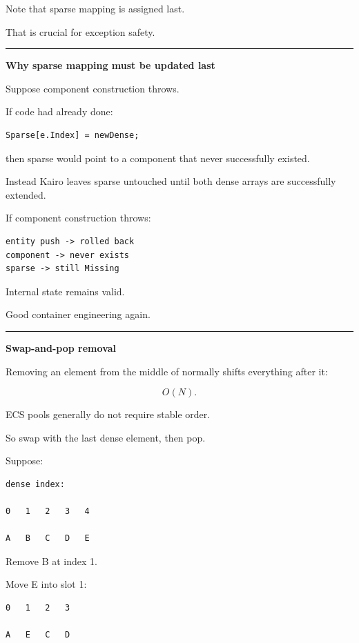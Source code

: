 Note that sparse mapping is assigned last.

That is crucial for exception safety.

\begin{center}\rule{0.5\linewidth}{0.5pt}\end{center}

\textbf{Why sparse mapping must be updated last}

Suppose component construction throws.

If code had already done:

\begin{verbatim}
Sparse[e.Index] = newDense;
\end{verbatim}

then sparse would point to a component that never successfully existed.

Instead Kairo leaves sparse untouched until both dense arrays are successfully extended.

If component construction throws:

\begin{verbatim}
entity push -> rolled back
component -> never exists
sparse -> still Missing
\end{verbatim}

Internal state remains valid.

Good container engineering again.

\begin{center}\rule{0.5\linewidth}{0.5pt}\end{center}

\textbf{Swap-and-pop removal}

Removing an element from the middle of  normally shifts everything after it:

\[
O(N).
\]

ECS pools generally do not require stable order.

So swap with the last dense element, then pop.

Suppose:

\begin{verbatim}
dense index:

0   1   2   3   4

A   B   C   D   E
\end{verbatim}

Remove B at index 1.

Move E into slot 1:

\begin{verbatim}
0   1   2   3

A   E   C   D
\end{verbatim}

